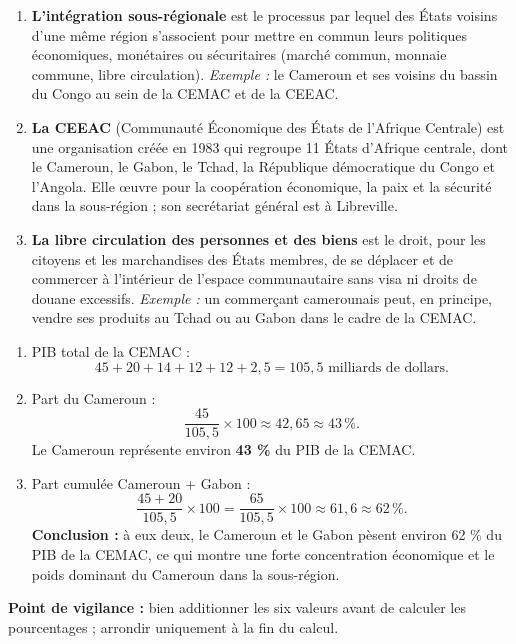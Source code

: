 \documentclass[11pt]{article}
\begin{document}
\begin{corrige}
\begin{enumerate}
\item \textbf{L'intégration sous-régionale} est le processus par lequel des États voisins d'une même région s'associent pour mettre en commun leurs politiques économiques, monétaires ou sécuritaires (marché commun, monnaie commune, libre circulation). \emph{Exemple :} le Cameroun et ses voisins du bassin du Congo au sein de la CEMAC et de la CEEAC.
\item \textbf{La CEEAC} (Communauté Économique des États de l'Afrique Centrale) est une organisation créée en 1983 qui regroupe 11 États d'Afrique centrale, dont le Cameroun, le Gabon, le Tchad, la République démocratique du Congo et l'Angola. Elle œuvre pour la coopération économique, la paix et la sécurité dans la sous-région ; son secrétariat général est à Libreville.
\item \textbf{La libre circulation des personnes et des biens} est le droit, pour les citoyens et les marchandises des États membres, de se déplacer et de commercer à l'intérieur de l'espace communautaire sans visa ni droits de douane excessifs. \emph{Exemple :} un commerçant camerounais peut, en principe, vendre ses produits au Tchad ou au Gabon dans le cadre de la CEMAC.
\end{enumerate}
\end{corrige}

\begin{corrige}
\begin{enumerate}
\item PIB total de la CEMAC :
\[ 45 + 20 + 14 + 12 + 12 + 2{,}5 = 105{,}5 \text{ milliards de dollars.} \]
\item Part du Cameroun :
\[ \frac{45}{105{,}5} \times 100 \approx 42{,}65 \approx 43\,\%. \]
Le Cameroun représente environ \textbf{43 \%} du PIB de la CEMAC.
\item Part cumulée Cameroun + Gabon :
\[ \frac{45 + 20}{105{,}5} \times 100 = \frac{65}{105{,}5} \times 100 \approx 61{,}6 \approx 62\,\%. \]
\textbf{Conclusion :} à eux deux, le Cameroun et le Gabon pèsent environ 62 \% du PIB de la CEMAC, ce qui montre une forte concentration économique et le poids dominant du Cameroun dans la sous-région.
\end{enumerate}
\textbf{Point de vigilance :} bien additionner les six valeurs avant de calculer les pourcentages ; arrondir uniquement à la fin du calcul.
\end{corrige}
\end{document}
